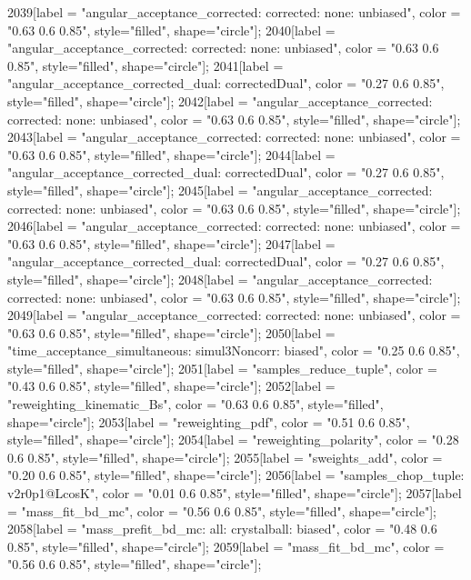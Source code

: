 {	2039[label = "angular_acceptance_corrected\nangacc: corrected\ncsp: none\ntrigger: unbiased", color = "0.63 0.6 0.85", style="filled", shape="circle"];
	2040[label = "angular_acceptance_corrected\nangacc: corrected\ncsp: none\ntrigger: unbiased", color = "0.63 0.6 0.85", style="filled", shape="circle"];
	2041[label = "angular_acceptance_corrected_dual\nstep: correctedDual", color = "0.27 0.6 0.85", style="filled", shape="circle"];
	2042[label = "angular_acceptance_corrected\nangacc: corrected\ncsp: none\ntrigger: unbiased", color = "0.63 0.6 0.85", style="filled", shape="circle"];
	2043[label = "angular_acceptance_corrected\nangacc: corrected\ncsp: none\ntrigger: unbiased", color = "0.63 0.6 0.85", style="filled", shape="circle"];
	2044[label = "angular_acceptance_corrected_dual\nstep: correctedDual", color = "0.27 0.6 0.85", style="filled", shape="circle"];
	2045[label = "angular_acceptance_corrected\nangacc: corrected\ncsp: none\ntrigger: unbiased", color = "0.63 0.6 0.85", style="filled", shape="circle"];
	2046[label = "angular_acceptance_corrected\nangacc: corrected\ncsp: none\ntrigger: unbiased", color = "0.63 0.6 0.85", style="filled", shape="circle"];
	2047[label = "angular_acceptance_corrected_dual\nstep: correctedDual", color = "0.27 0.6 0.85", style="filled", shape="circle"];
	2048[label = "angular_acceptance_corrected\nangacc: corrected\ncsp: none\ntrigger: unbiased", color = "0.63 0.6 0.85", style="filled", shape="circle"];
	2049[label = "angular_acceptance_corrected\nangacc: corrected\ncsp: none\ntrigger: unbiased", color = "0.63 0.6 0.85", style="filled", shape="circle"];
	2050[label = "time_acceptance_simultaneous\ntimeacc: simul3Noncorr\ntrigger: biased", color = "0.25 0.6 0.85", style="filled", shape="circle"];
	2051[label = "samples_reduce_tuple", color = "0.43 0.6 0.85", style="filled", shape="circle"];
	2052[label = "reweighting_kinematic_Bs", color = "0.63 0.6 0.85", style="filled", shape="circle"];
	2053[label = "reweighting_pdf", color = "0.51 0.6 0.85", style="filled", shape="circle"];
	2054[label = "reweighting_polarity", color = "0.28 0.6 0.85", style="filled", shape="circle"];
	2055[label = "sweights_add", color = "0.20 0.6 0.85", style="filled", shape="circle"];
	2056[label = "samples_chop_tuple\nversion: v2r0p1@LcosK", color = "0.01 0.6 0.85", style="filled", shape="circle"];
	2057[label = "mass_fit_bd_mc", color = "0.56 0.6 0.85", style="filled", shape="circle"];
	2058[label = "mass_prefit_bd_mc\nmassbin: all\nmassmodel: crystalball\ntrigger: biased", color = "0.48 0.6 0.85", style="filled", shape="circle"];
	2059[label = "mass_fit_bd_mc", color = "0.56 0.6 0.85", style="filled", shape="circle"];
}
